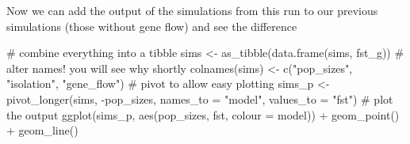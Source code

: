 \documentclass[
  letterpaper,
  DIV=11,
  numbers=noendperiod]{scrartcl}
\newenvironment{Shaded}{\begin{snugshade}}{\end{snugshade}}
\newcommand{\AttributeTok}[1]{\textcolor[rgb]{0.40,0.45,0.13}{#1}}
\newcommand{\CommentTok}[1]{\textcolor[rgb]{0.37,0.37,0.37}{#1}}
\newcommand{\DecValTok}[1]{\textcolor[rgb]{0.68,0.00,0.00}{#1}}
\newcommand{\FunctionTok}[1]{\textcolor[rgb]{0.28,0.35,0.67}{#1}}
\newcommand{\NormalTok}[1]{\textcolor[rgb]{0.00,0.23,0.31}{#1}}
\newcommand{\OtherTok}[1]{\textcolor[rgb]{0.00,0.23,0.31}{#1}}
\newcommand{\SpecialCharTok}[1]{\textcolor[rgb]{0.37,0.37,0.37}{#1}}
\newcommand{\StringTok}[1]{\textcolor[rgb]{0.13,0.47,0.30}{#1}}
\begin{document}
\begin{Shaded}
\end{Shaded}

Now we can add the output of the simulations from this run to our
previous simulations (those without gene flow) and see the difference

\begin{Shaded}
\begin{Highlighting}[]
\CommentTok{\# combine everything into a tibble}
\NormalTok{sims }\OtherTok{\textless{}{-}} \FunctionTok{as\_tibble}\NormalTok{(}\FunctionTok{data.frame}\NormalTok{(sims, fst\_g))}
\CommentTok{\# alter names! you will see why shortly }
\FunctionTok{colnames}\NormalTok{(sims) }\OtherTok{\textless{}{-}} \FunctionTok{c}\NormalTok{(}\StringTok{"pop\_sizes"}\NormalTok{, }\StringTok{"isolation"}\NormalTok{, }\StringTok{"gene\_flow"}\NormalTok{)}
\CommentTok{\# pivot to allow easy plotting}
\NormalTok{sims\_p }\OtherTok{\textless{}{-}} \FunctionTok{pivot\_longer}\NormalTok{(sims, }\SpecialCharTok{{-}}\NormalTok{pop\_sizes, }\AttributeTok{names\_to =} \StringTok{"model"}\NormalTok{, }\AttributeTok{values\_to =} \StringTok{"fst"}\NormalTok{)}
\CommentTok{\# plot the output}
\FunctionTok{ggplot}\NormalTok{(sims\_p, }\FunctionTok{aes}\NormalTok{(pop\_sizes, fst, }\AttributeTok{colour =}\NormalTok{ model)) }\SpecialCharTok{+} \FunctionTok{geom\_point}\NormalTok{() }\SpecialCharTok{+} \FunctionTok{geom\_line}\NormalTok{()}
\end{Highlighting}
\end{Shaded}
\end{document}
